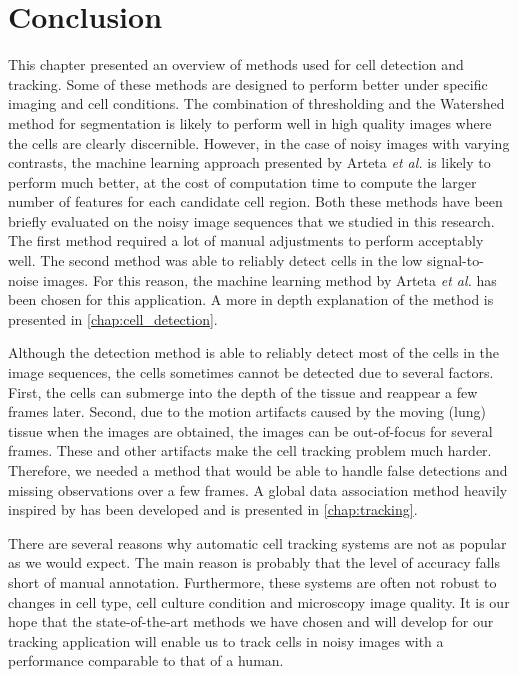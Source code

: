 \section{Conclusion}
\label{sec:conclusionmethods}
This chapter presented an overview of methods used for cell detection and tracking. Some of these methods are designed to perform better under specific imaging and cell conditions. The combination of thresholding and the Watershed method for segmentation is likely to perform well in high quality images where the cells are clearly discernible. However, in the case of noisy images with varying contrasts, the machine learning approach presented by Arteta \emph{et al.} is likely to perform much better, at the cost of computation time to compute the larger number of features for each candidate cell region. Both these methods have been briefly evaluated on the noisy image sequences that we studied in this research. The first method required a lot of manual adjustments to perform acceptably well. The second method was able to reliably detect cells in the low signal-to-noise images. For this reason, the machine learning method by Arteta \emph{et al.} has been chosen for this application. A more in depth explanation of the method is presented in \cref{chap:cell_detection}.

Although the detection method is able to reliably detect most of the cells in the image sequences, the cells sometimes cannot be detected due to several factors. First, the cells can submerge into the depth of the tissue and reappear a few frames later. Second, due to the motion artifacts caused by the moving (lung) tissue when the images are obtained, the images can be out-of-focus for several frames. These and other artifacts make the cell tracking problem much harder. Therefore, we needed a method that would be able to handle false detections and missing observations over a few frames. A global data association method heavily inspired by \cite{bise11global} has been developed and is presented in \cref{chap:tracking}.

There are several reasons why automatic cell tracking systems are not as popular as we would expect. The main reason is probably that the level of accuracy falls short of manual annotation. Furthermore, these systems are often not robust to changes in cell type, cell culture condition and microscopy image quality. It is our hope that the state-of-the-art methods we have chosen and will develop for our tracking application will enable us to track cells in noisy images with a performance comparable to that of a human.
